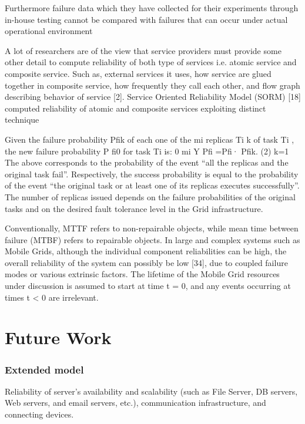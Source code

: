 \documentclass{cslthse-msc}
\begin{document}
Furthermore failure data which they have collected for their experiments through in-house testing cannot be compared with failures that can occur under actual operational environment \cite{surveyReliabilityDistr}

A lot of researchers are of the view that service providers must provide some other detail to compute reliability of both type of services i.e. atomic service and composite service. Such as, external services it uses, how service are glued together in composite service, how frequently they call each other, and flow graph describing behavior of service [2]. Service Oriented Reliability Model (SORM) [18] computed reliability of atomic and composite services exploiting distinct technique \cite{surveyReliabilityDistr}

Given the failure probability Pfik of each one of the mi replicas Ti k of task Ti , the new failure probability P fi0 for task Ti is:
0 mi Y
Pfi =Pfi· Pfik. (2) k=1
The above corresponds to the probability of the event “all the replicas and the original task fail”. Respectively, the success probability is equal to the probability of the event “the original task or at least one of its replicas executes successfully”. The number of replicas issued depends on the failure probabilities of the original tasks and on the desired fault tolerance level in the Grid infrastructure.  \cite{effTaskReplMobGrid}

Conventionally, MTTF refers to non-repairable objects, while mean time between failure (MTBF) refers to repairable objects. In large and complex systems such as Mobile Grids, although the individual component reliabilities can be high, the overall reliability of the system can possibly be low [34], due to coupled failure modes or various extrinsic factors. The lifetime of the Mobile Grid resources under discussion is assumed to start at time t = 0, and any events occurring at times t < 0 are irrelevant. \cite{effTaskReplMobGrid}



\chapter{Future Work} \label{ch:future_work}
\subsection{Extended model}
Reliability of server’s availability and scalability (such as File Server, DB servers, Web servers, and email servers, etc.), communication infrastructure, and connecting devices. \cite{surveyReliabilityDistr}
\end{document}
